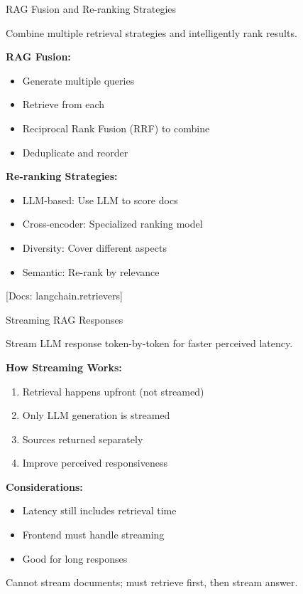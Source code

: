\documentclass[aspectratio=169,11pt]{beamer}
\newcommand{\docref}[1]{{\scriptsize\color{docgray}[Docs: #1]}}
\begin{document}
\begin{frame}{RAG Fusion and Re-ranking Strategies}
  \begin{conceptbox}
    Combine multiple retrieval strategies and intelligently rank results.
  \end{conceptbox}

  \textbf{RAG Fusion:}
  \begin{itemize}
    \setlength{\itemsep}{1pt}
    \item Generate multiple queries
    \item Retrieve from each
    \item Reciprocal Rank Fusion (RRF) to combine
    \item Deduplicate and reorder
  \end{itemize}

  \textbf{Re-ranking Strategies:}
  \begin{itemize}
    \setlength{\itemsep}{1pt}
    \item LLM-based: Use LLM to score docs
    \item Cross-encoder: Specialized ranking model
    \item Diversity: Cover different aspects
    \item Semantic: Re-rank by relevance
  \end{itemize}

  \docref{langchain.retrievers}
\end{frame}

\begin{frame}{Streaming RAG Responses}
  \begin{tipbox}
    Stream LLM response token-by-token for faster perceived latency.
  \end{tipbox}

  \textbf{How Streaming Works:}
  \begin{enumerate}
    \setlength{\itemsep}{0pt}
    \item Retrieval happens upfront (not streamed)
    \item Only LLM generation is streamed
    \item Sources returned separately
    \item Improve perceived responsiveness
  \end{enumerate}

  \textbf{Considerations:}
  \begin{itemize}
    \setlength{\itemsep}{1pt}
    \item Latency still includes retrieval time
    \item Frontend must handle streaming
    \item Good for long responses
  \end{itemize}

  \begin{warningbox}[Limitation]
    Cannot stream documents; must retrieve first, then stream answer.
  \end{warningbox}
\end{frame}
\end{document}
